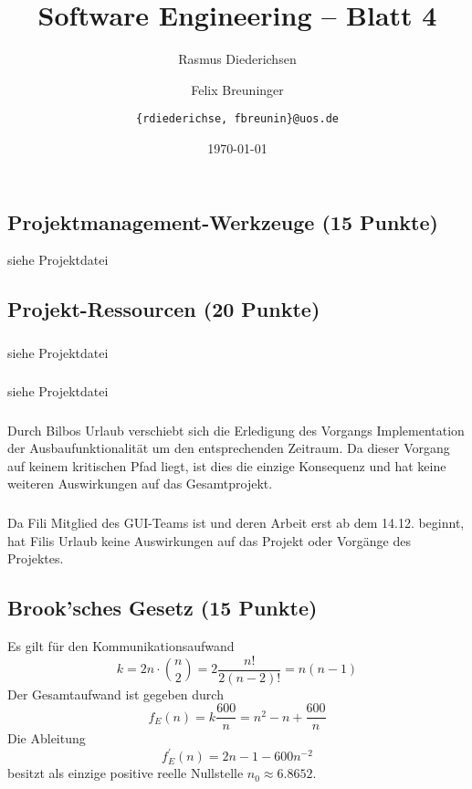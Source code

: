 \documentclass{scrartcl}
\title{\rmfamily Software Engineering -- Blatt 4}
\author{Rasmus Diederichsen \and Felix Breuninger\and %
   \texttt{\{rdiederichse, fbreunin\}@uos.de}
}
\date{\today}
\begin{document}
\selectfont
\maketitle

\setcounter{section}{4}
\setcounter{subsection}{0}

\subsection{Projektmanagement-Werkzeuge (15 Punkte)}
siehe Projektdatei

\subsection{Projekt-Ressourcen (20 Punkte)}
\subsubsection{}
siehe Projektdatei
\subsubsection{}
siehe Projektdatei

\subsubsection{}
Durch Bilbos Urlaub verschiebt sich die Erledigung des Vorgangs Implementation der Ausbaufunktionalität um den entsprechenden Zeitraum. Da dieser Vorgang auf keinem kritischen Pfad liegt, ist dies die einzige Konsequenz und hat keine weiteren Auswirkungen auf das Gesamtprojekt.

\subsubsection{}
Da Fili Mitglied des GUI-Teams ist und deren Arbeit erst ab dem 14.12. beginnt, hat Filis Urlaub keine Auswirkungen auf das Projekt oder Vorgänge des Projektes.

\subsection{Brook'sches Gesetz (15 Punkte)}

Es gilt für den Kommunikationsaufwand
\begin{equation*}
   k = 2n \cdot {n \choose 2} = 2 \frac{n!}{2(n-2)!} = n(n-1)
\end{equation*}
Der Gesamtaufwand ist gegeben durch
\begin{equation*}
   f_E(n) = k \frac{600}{n} = n^2 - n + \frac{600}{n}
\end{equation*}
Die Ableitung
\begin{equation*}
   f_E^\prime(n) = 2n -1 - 600n^{-2}
\end{equation*}
besitzt als einzige positive reelle Nullstelle $n_0 \approx 6.8652$.
\end{document}
